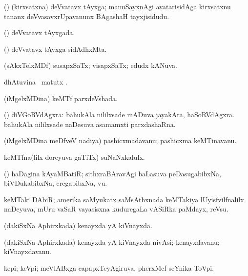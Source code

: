 \bentry
{}
\gl{\nA}
\bmng
(\deVva) (kirxsatxna) deVvatavx tAyxga; manuSayxnAgi avatarisidAga kirxsatxnu tananx deVvasavxrUpavanunx BAgashaH tayxjisidudu. 
\emng
\eentry

\bentry
{}
\gl{\gu}
\bmng
(\kerxY) deVvatavx tAyxgada. 
\emng
\eentry

\bentry
{}
\gl{\nA}
\bmng
(\kerxY) deVvatavx tAyxga sidAdhxMta. 
\emng
\eentry

\bentry
{}
\gl{\gu}
\bmng
(sAkxTelxMDf) susapxSaTx; visapxSaTx; edudx kANuva. 
\emng
\eentry

\bentry
{}
\gl{\kirx}
\bmng
{} dhAtuvina \BU\ matutx \BUkaq. 
\emng
\eentry

\bentry
{}
\gl{\gu}
\bmng
(iMgelxMDina) keMTf parxdeVshada. 
\emng
\eentry

\bentry
{}
\gl{\nA}
\bmng
(\birx) diVGoRVdAgxra: 
\banum
{} bahukAla nililxsade mADuva jayakAra, haSoRVdAgxra. 
 bahukAla nililxsade naDesuva asamamxti parxdashaRna. 
\eanum
\emng
\eentry

\bentry
{}
\gl{\nA}
\bmng
(iMgelxMDina meDfveV nadiya) pashicxmadavanu; pashicxma keMTinavanu. 
\emng
\eentry

\bentry
{}
\gl{\nA}
\bmng
keMTfna(lilx doreyuva gaTiTx) suNaNxkalulx. 
\emng
\eentry

\bentry
{}
\gl{\nA}
\bmng
(\nw) haDagina kAyaMBatiR; sithxraBAravAgi baLasuva peDasugabibxNa, biVDukabibxNa, eregabibxNa, \mo vu. 
\emng
\eentry

\bentry
{}
\gl{\nA}
\bmng
keMTaki DAbiR; amerika saMyukatx saMsAthxnada keMTakiya lUyisfvilfnalilx naDeyuva, mUru vaSaR vayasisxna kuduregaLa vASiRka paMdayx, reVsu. 
\emng
\eentry

\bentry
{}
\gl{\gu}
\bmng
(dakiSxNa Aphirxkada) kenayxda yA kiVnayxda. 
\emng
\eentry

\bentry
{}
\gl{\nA}
\bmng
(dakiSxNa Aphirxkada) kenayxda yA kiVnayxda nivAsi; kenayxdavanu; kiVnayxdavanu. 
\emng
\eentry

\bentry
{}
\gl{\nA}
\bmng
kepi; keVpi; meVlABxga capapxTeyAgiruva, pherxMcf seYnika ToVpi.   
\emng
\eentry


